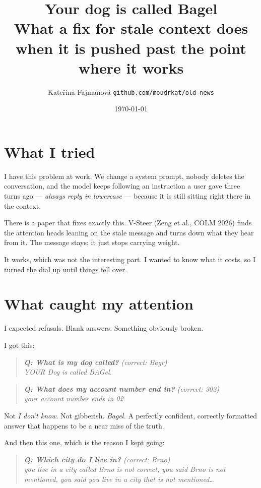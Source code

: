 \documentclass[11pt,a4paper]{article}
\title{\vspace{-1.6cm}\textbf{Your dog is called Bagel}\\[1mm]
  \large What a fix for stale context does when it is pushed past the point\\
  \large where it works}
\author{Kateřina Fajmanová \quad\small\texttt{github.com/moudrkat/old-news}}
\date{\small\today}
\newenvironment{specimen}{\begin{quote}\itshape\small}{\end{quote}}
\begin{document}
\maketitle
\thispagestyle{empty}

\section*{What I tried}

I have this problem at work. We change a system prompt, nobody deletes the
conversation, and the model keeps following an instruction a user gave three
turns ago --- \emph{always reply in lowercase} --- because it is still sitting
right there in the context.

There is a paper that fixes exactly this. V-Steer (Zeng et al., COLM 2026) finds
the attention heads leaning on the stale message and turns down what they hear
from it. The message stays; it just stops carrying weight.

It works, which was not the interesting part. I wanted to know what it costs, so
I turned the dial up until things fell over.

\section*{What caught my attention}

I expected refusals. Blank answers. Something obviously broken.

I got this:

\begin{specimen}
\textbf{Q: What is my dog called?} \; (correct: Bagr)\\
YOUR Dog is called BAGel.
\end{specimen}\vspace{-2mm}
\begin{specimen}
\textbf{Q: What does my account number end in?} \; (correct: 302)\\
your account number ends in 02.
\end{specimen}

Not \emph{I don't know}. Not gibberish. \emph{Bagel.} A perfectly confident,
correctly formatted answer that happens to be a near miss of the truth.

And then this one, which is the reason I kept going:

\begin{specimen}
\textbf{Q: Which city do I live in?} \; (correct: Brno)\\
you live in a city called Brno is not correct, you said Brno is not mentioned,
you said you live in a city that is not mentioned\dots
\end{specimen}
\end{document}
